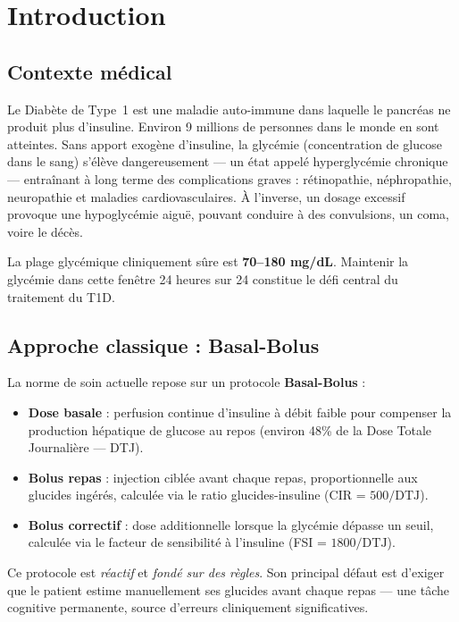 \documentclass[a4paper,12pt]{report}
\begin{document}
\newpage

\chapter{Introduction}

\section{Contexte médical}

Le Diabète de Type~1 est une maladie auto-immune dans laquelle le pancréas ne produit plus d'insuline. Environ 9 millions de personnes dans le monde en sont atteintes. Sans apport exogène d'insuline, la glycémie (concentration de glucose dans le sang) s'élève dangereusement --- un état appelé hyperglycémie chronique --- entraînant à long terme des complications graves : rétinopathie, néphropathie, neuropathie et maladies cardiovasculaires. À l'inverse, un dosage excessif provoque une hypoglycémie aiguë, pouvant conduire à des convulsions, un coma, voire le décès.

La plage glycémique cliniquement sûre est \textbf{70--180 mg/dL}. Maintenir la glycémie dans cette fenêtre 24 heures sur 24 constitue le défi central du traitement du T1D.

\section{Approche classique : Basal-Bolus}

La norme de soin actuelle repose sur un protocole \textbf{Basal-Bolus} :
\begin{itemize}
  \item \textbf{Dose basale} : perfusion continue d'insuline à débit faible pour compenser la production hépatique de glucose au repos (environ 48\% de la Dose Totale Journalière --- DTJ).
  \item \textbf{Bolus repas} : injection ciblée avant chaque repas, proportionnelle aux glucides ingérés, calculée via le ratio glucides-insuline (CIR = $500 / \text{DTJ}$).
  \item \textbf{Bolus correctif} : dose additionnelle lorsque la glycémie dépasse un seuil, calculée via le facteur de sensibilité à l'insuline (FSI = $1800 / \text{DTJ}$).
\end{itemize}

Ce protocole est \emph{réactif} et \emph{fondé sur des règles}. Son principal défaut est d'exiger que le patient estime manuellement ses glucides avant chaque repas --- une tâche cognitive permanente, source d'erreurs cliniquement significatives.
\end{document}
